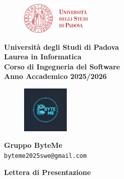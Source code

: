 \documentclass[11pt,a4paper]{article}
\begin{document}
\begin{titlepage}
    \centering
    
    \begin{figure}[H]
        \centering
        \includegraphics[width=0.3\textwidth]{logoUnipd.jpg}
    \end{figure}
    
    \vspace{0.5cm}
    
    \textbf{\Large Università degli Studi di Padova} \\
    \vspace{0.2cm}
    \textbf{Laurea in Informatica} \\
    \vspace{0.2cm}
    \textbf{Corso di Ingegneria del Software} \\
    \vspace{0.2cm}
    \textbf{Anno Accademico 2025/2026} \\
    
    \vspace{1cm}
    
    \begin{figure}[H]
        \centering
        \includegraphics[width=0.2\textwidth]{LogoByteMe.jpg}
    \end{figure}
    
    \vspace{0.5cm}
    
    \textbf{\Large Gruppo ByteMe} \\
    \vspace{0.2cm}
    \texttt{byteme2025swe@gmail.com} \\
    
    \vspace{1cm}
    
    \textbf{\Huge Lettera di Presentazione} \\
    
    \vspace{1.5cm}
    

\end{titlepage}
\end{document}
